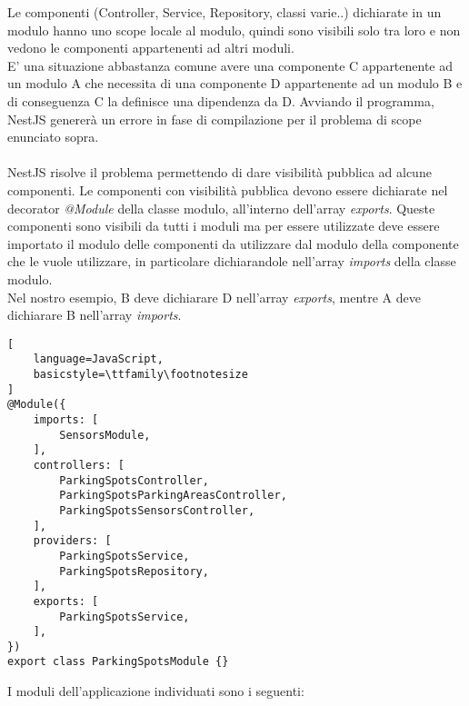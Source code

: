 Le componenti (Controller, Service, Repository, classi varie..) dichiarate 
in un modulo hanno uno scope locale al modulo, quindi sono visibili solo tra loro e non vedono
le componenti appartenenti ad altri moduli.
\\
E' una situazione abbastanza comune avere una componente C appartenente ad un modulo A che necessita di una componente D
appartenente ad un modulo B
e di conseguenza C la definisce una dipendenza da D. Avviando il programma, NestJS genererà un errore in fase di compilazione per il problema
di scope enunciato sopra.
\\\\
NestJS risolve il problema permettendo di dare visibilità pubblica ad alcune componenti.
Le componenti con visibilità pubblica devono essere dichiarate nel decorator \textit{@Module} della classe modulo, all'interno
dell'array \textit{exports}. Queste componenti sono visibili da tutti i moduli ma per essere utilizzate deve 
essere importato il modulo delle componenti da utilizzare dal modulo della componente che le vuole utilizzare, in particolare dichiarandole nell'array \textit{imports}
della classe modulo.
\\
Nel nostro esempio, B deve dichiarare D nell'array \textit{exports}, mentre A deve dichiarare B nell'array \textit{imports}.
\\
\begin{lstlisting}[
    language=JavaScript,
    basicstyle=\ttfamily\footnotesize
]
@Module({
    imports: [ 
        SensorsModule,
    ],
    controllers: [
        ParkingSpotsController, 
        ParkingSpotsParkingAreasController,
        ParkingSpotsSensorsController,
    ],
    providers: [
        ParkingSpotsService,
        ParkingSpotsRepository,
    ],
    exports: [
        ParkingSpotsService,
    ],
})
export class ParkingSpotsModule {}
\end{lstlisting}
\leavevmode\newline
I moduli dell'applicazione individuati sono i seguenti:
